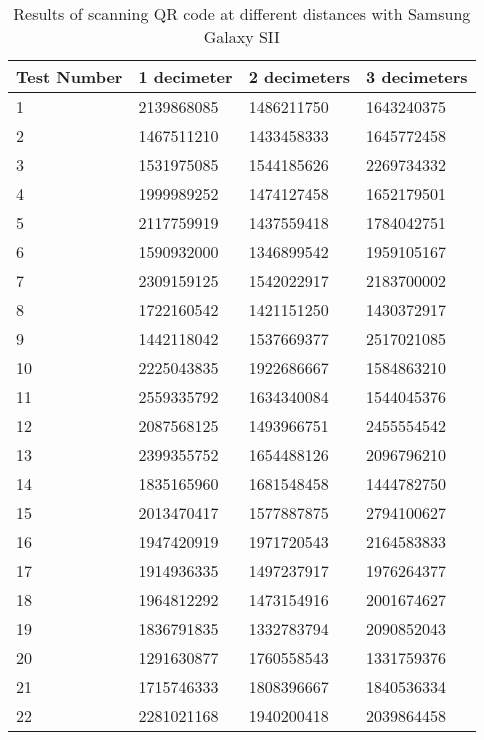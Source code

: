 \begin{table}[ht!]
\begin{tabularx}{\textwidth}{l|X|X|X}
		\end{tabularx}
	\end{table}

	\begin{table}[ht!]
    		\caption{Results of scanning QR code at different distances with Samsung Galaxy SII} \label{tab:distamceGoogleGlassFull}
		\centering \begin{tabularx}{\textwidth}{l|X|X|X} \hline
		Test Number & \textbf{1 decimeter} & \textbf{2 decimeters} & \textbf{3 decimeters} \\ \hline \hline
		
		1&	2139868085	&	1486211750	&	1643240375	\\ \hline
		2&	1467511210	&	1433458333	&	1645772458	\\ \hline
		3&	1531975085	&	1544185626	&	2269734332	\\ \hline
		4&	1999989252	&	1474127458	&	1652179501	\\ \hline
		5&	2117759919	&	1437559418	&	1784042751	\\ \hline
		6&	1590932000	&	1346899542	&	1959105167	\\ \hline
		7&	2309159125	&	1542022917	&	2183700002	\\ \hline
		8&	1722160542	&	1421151250	&	1430372917	\\ \hline
		9&	1442118042	&	1537669377	&	2517021085	\\ \hline
		10&	2225043835	&	1922686667	&	1584863210	\\ \hline
		11&	2559335792	&	1634340084	&	1544045376	\\ \hline
		12&	2087568125	&	1493966751	&	2455554542	\\ \hline
		13&	2399355752	&	1654488126	&	2096796210	\\ \hline
		14&	1835165960	&	1681548458	&	1444782750	\\ \hline
		15&	2013470417	&	1577887875	&	2794100627	\\ \hline
		16&	1947420919	&	1971720543	&	2164583833	\\ \hline
		17&	1914936335	&	1497237917	&	1976264377	\\ \hline
		18&	1964812292	&	1473154916	&	2001674627	\\ \hline
		19&	1836791835	&	1332783794	&	2090852043	\\ \hline
		20&	1291630877	&	1760558543	&	1331759376	\\ \hline
		21&	1715746333	&	1808396667	&	1840536334	\\ \hline
		22&	2281021168	&	1940200418	&	2039864458	\\ \hline

\end{tabularx}
\end{table}
